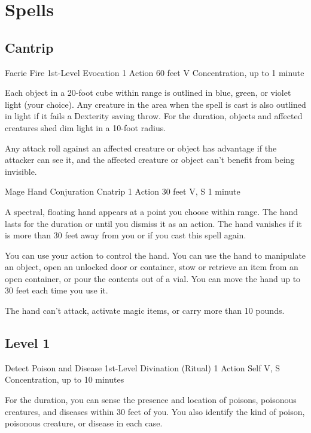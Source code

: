 \documentclass[letterpaper,openany,oneside,twocolumn]{book}
\begin{document}
\section*{Spells}
\subsection*{Cantrip}

\DndSpellHeader
  {Faerie Fire}
  {1st-Level Evocation}
  {1 Action}
  {60 feet}
  {V}
  {Concentration, up to 1 minute}

Each object in a 20-foot cube within range is outlined in blue, green, or violet light (your choice). Any creature in the area when the spell is cast is also outlined in light if it fails a Dexterity saving throw. For the duration, objects and affected creatures shed dim light in a 10-foot radius.

Any attack roll against an affected creature or object has advantage if the attacker can see it, and the affected creature or object can't benefit from being invisible.

\DndSpellHeader
  {Mage Hand}
  {Conjuration Cnatrip}
  {1 Action}
  {30 feet}
  {V, S}
  {1 minute}

A spectral, floating hand appears at a point you choose within range. The hand lasts for the duration or until you dismiss it as an action. The hand vanishes if it is more than 30 feet away from you or if you cast this spell again.

You can use your action to control the hand. You can use the hand to manipulate an object, open an unlocked door or container, stow or retrieve an item from an open container, or pour the contents out of a vial. You can move the hand up to 30 feet each time you use it.

The hand can't attack, activate magic items, or carry more than 10 pounds.

\subsection*{Level 1}

\DndSpellHeader
  {Detect Poison and Disease}
  {1st-Level Divination (Ritual)}
  {1 Action}
  {Self}
  {V, S}
  {Concentration, up to 10 minutes}

For the duration, you can sense the presence and location of poisons, poisonous creatures, and diseases within 30 feet of you. You also identify the kind of poison, poisonous creature, or disease in each case.
\end{document}

